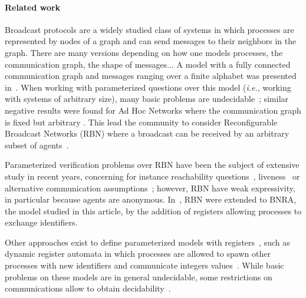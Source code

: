 \paragraph*{Related work} 
Broadcast protocols are a widely studied class of systems in which processes are represented by nodes of a graph and can send messages to their neighbors in the graph. There are many versions depending on how one models processes, the communication graph, the shape of messages... 
A model with a fully connected communication graph and messages ranging over a finite alphabet was presented in~\cite{emerson1998model}. When working with parameterized questions over this model (\emph{i.e.}, working with systems of arbitrary size), many basic problems are undecidable~\cite{EsparzaFM1999verification}; similar negative results were found for Ad Hoc Networks where the communication graph is fixed but arbitrary \cite{DelzannoSZ2010Adhoc}. This lead the community to consider Reconfigurable Broadcast Networks (RBN) where a broadcast can be received by an arbitrary subset of agents~\cite{DelzannoSZ2010Adhoc}.

Parameterized verification problems over RBN have been the subject of extensive study in recent years, concerning for instance reachability questions~\cite{DelzannoSTZ12, BalasubramanianGW22}, liveness~\cite{DBLP:journals/computing/ChiniMS22} or alternative communication assumptions~\cite{Balasubramanian18}; however, RBN have weak expressivity, in particular because agents are anonymous. In~\cite{DelzannoST13}, RBN were extended to BNRA, the model studied in this article, by the addition of registers allowing processes to exchange identifiers. 

Other approaches exist to define parameterized models with registers~\cite{BolligRS21}, such as dynamic register automata in which processes are allowed to spawn other processes with new identifiers and communicate integers values~\cite{AbdullaAKR14}. While basic problems on these models are in general undecidable, some restrictions on communications allow to obtain decidability~\cite{AbdullaAKR15, Rezine17}.


